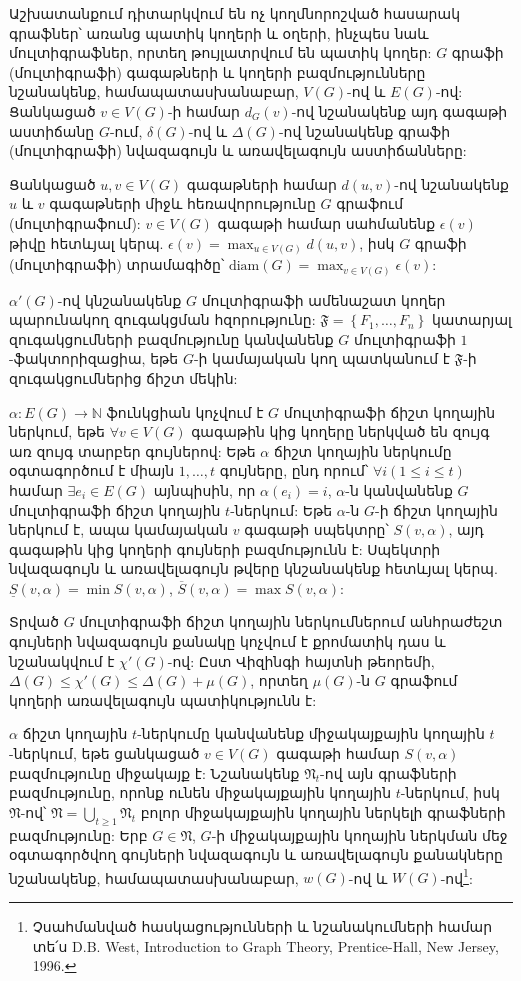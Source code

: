 
Աշխատանքում դիտարկվում են ոչ կողմնորոշված հասարակ գրաֆներ՝ առանց պատիկ կողերի և օղերի, ինչպես նաև մուլտիգրաֆներ, որտեղ թույլատրվում են պատիկ կողեր: $G$ գրաֆի (մուլտիգրաֆի) գագաթների և կողերի բազմությունները նշանակենք, համապատասխանաբար, $V(G)$-ով և $E(G)$-ով: Ցանկացած $v\in V(G)$-ի համար $d_G(v)$-ով նշանակենք այդ գագաթի աստիճանը $G$-ում, $\delta(G)$-ով և $\Delta(G)$-ով նշանակենք գրաֆի (մուլտիգրաֆի) նվազագույն և առավելագույն աստիճանները:

Ցանկացած $u,v\in V(G)$ գագաթների համար $d(u,v)$-ով նշանակենք $u$ և $v$ գագաթների միջև հեռավորությունը $G$ գրաֆում (մուլտիգրաֆում): $v \in V(G)$ գագաթի համար սահմանենք $\epsilon(v)$ թիվը հետևյալ կերպ.
$\epsilon(v) = \max_{u\in V(G)}{d(u,v)}$,
իսկ $G$ գրաֆի (մուլտիգրաֆի) տրամագիծը՝ 
$\mathrm{diam}(G) = \max_{v\in V(G)}{\epsilon(v)}$:

$\alpha'(G)$-ով կնշանակենք $G$ մուլտիգրաֆի ամենաշատ կողեր պարունակող զուգակցման հզորությունը: $\mathfrak{F} = \left\{F_1,\ldots,F_n \right\}$ կատարյալ զուգակցումների բազմությունը կանվանենք $G$ մուլտիգրաֆի $1$-ֆակտորիզացիա, եթե $G$-ի կամայական կող պատկանում է $\mathfrak{F}$-ի զուգակցումներից ճիշտ մեկին:

$\alpha : E(G) \rightarrow \mathbb{N}$ ֆունկցիան կոչվում է $G$ մուլտիգրաֆի ճիշտ կողային ներկում, եթե $\forall v \in V(G)$ գագաթին կից կողերը ներկված են զույգ առ զույգ տարբեր գույներով:
Եթե $\alpha$ ճիշտ կողային ներկումը օգտագործում է միայն $1,\ldots,t$ գույները, ընդ որում՝ $\forall i (1 \leq i \leq t)$ համար $\exists e_i \in E(G)$ այնպիսին, որ $\alpha(e_i)=i$, $\alpha$-ն կանվանենք $G$ մուլտիգրաֆի ճիշտ կողային $t$-ներկում: Եթե $\alpha$-ն $G$-ի ճիշտ կողային ներկում է, ապա կամայական $v$ գագաթի սպեկտրը՝ $S(v,\alpha)$, այդ գագաթին կից կողերի գույների բազմությունն է: Սպեկտրի նվազագույն և առավելագույն թվերը կնշանակենք հետևյալ կերպ. $\underline{S}(v, \alpha) = \min{S(v,\alpha)}$, $\overline{S}(v, \alpha) = \max{S(v,\alpha)}$:

Տրված $G$ մուլտիգրաֆի ճիշտ կողային ներկումներում անհրաժեշտ գույների նվազագույն քանակը կոչվում է քրոմատիկ դաս և նշանակվում է $\chi'(G)$-ով: Ըստ Վիզինգի հայտնի թեորեմի, $\Delta(G) \leq \chi'(G) \leq \Delta(G) + \mu(G)$, որտեղ $\mu(G)$-ն $G$ գրաֆում կողերի առավելագույն պատիկությունն է: 

$\alpha$ ճիշտ կողային $t$-ներկումը կանվանենք միջակայքային կողային $t$-ներկում, եթե ցանկացած $v \in V(G)$ գագաթի համար $S(v,\alpha)$ բազմությունը միջակայք է: Նշանակենք $\mathfrak{N}_t$-ով այն գրաֆների բազմությունը, որոնք ունեն միջակայքային կողային $t$-ներկում, իսկ $\mathfrak{N}$-ով՝ $\mathfrak{N}=\bigcup_{t\geq1}{\mathfrak{N}_t}$ բոլոր միջակայքային կողային ներկելի գրաֆների բազմությունը: Երբ $G \in \mathfrak{N}$, $G$-ի միջակայքային կողային ներկման մեջ օգտագործվող գույների նվազագույն և առավելագույն քանակները նշանակենք, համապատասխանաբար, $w(G)$-ով և $W(G)$-ով\footnote{Չսահմանված հասկացությունների և նշանակումների համար տե՛ս D.B. West, Introduction to Graph Theory, Prentice-Hall, New Jersey, 1996.}: